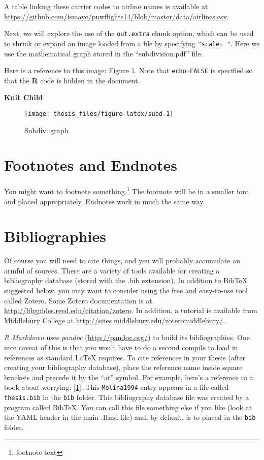 \documentclass[twoside,12pt,final]{ucthesis-CA2012}
\begin{document}
\begin{ucmainmatter}
A table linking these carrier codes to airline names is available at \url{https://github.com/ismayc/pnwflights14/blob/master/data/airlines.csv}.

\clearpage

Next, we will explore the use of the \texttt{out.extra} chunk option, which can be used to shrink or expand an image loaded from a file by specifying \texttt{"scale=\ "}. Here we use the mathematical graph stored in the ``subdivision.pdf'' file.

Here is a reference to this image: Figure \ref{fig:subd}. Note that \texttt{echo=FALSE} is specified so that the \textbf{R} code is hidden in the document.

\textbf{Knit Child}
\begin{figure}
\texttt{[image: thesis\_files/figure-latex/subd-1]} \caption{Subdiv. graph}\label{fig:subd}
\end{figure}
\hypertarget{footnotes-and-endnotes}{%
\section{Footnotes and Endnotes}\label{footnotes-and-endnotes}}

You might want to footnote something.\footnote{footnote text} The footnote will be in a smaller font and placed appropriately. Endnotes work in much the same way.

\hypertarget{bibliographies}{%
\section{Bibliographies}\label{bibliographies}}

Of course you will need to cite things, and you will probably accumulate an armful of sources. There are a variety of tools available for creating a bibliography database (stored with the .bib extension). In addition to BibTeX suggested below, you may want to consider using the free and easy-to-use tool called Zotero. Some Zotero documentation is at \url{http://libguides.reed.edu/citation/zotero}. In addition, a tutorial is available from Middlebury College at \url{http://sites.middlebury.edu/zoteromiddlebury/}.

\emph{R Markdown} uses \emph{pandoc} (\url{http://pandoc.org/}) to build its bibliographies. One nice caveat of this is that you won't have to do a second compile to load in references as standard LaTeX requires. To cite references in your thesis (after creating your bibliography database), place the reference name inside square brackets and precede it by the ``at'' symbol. For example, here's a reference to a book about worrying: {[}\protect\hyperlink{ref-Molina1994}{1}{]}. This \texttt{Molina1994} entry appears in a file called \texttt{thesis.bib} in the \texttt{bib} folder. This bibliography database file was created by a program called BibTeX. You can call this file something else if you like (look at the YAML header in the main .Rmd file) and, by default, is to placed in the \texttt{bib} folder.


\end{ucmainmatter}
\end{document}
